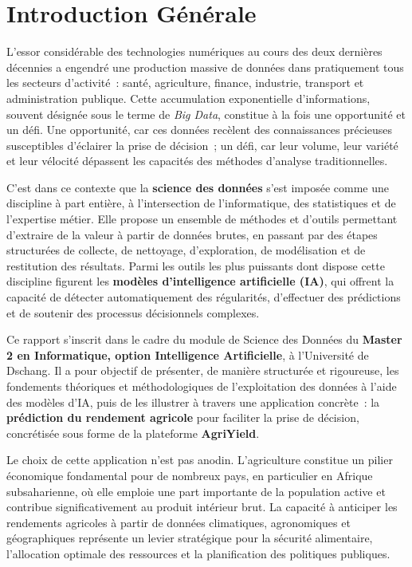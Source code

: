 \chapter*{Introduction Générale}

L'essor considérable des technologies numériques au cours des deux dernières décennies a engendré une production massive de données dans pratiquement tous les secteurs d'activité~: santé, agriculture, finance, industrie, transport et administration publique. Cette accumulation exponentielle d'informations, souvent désignée sous le terme de \textit{Big Data}, constitue à la fois une opportunité et un défi. Une opportunité, car ces données recèlent des connaissances précieuses susceptibles d'éclairer la prise de décision~; un défi, car leur volume, leur variété et leur vélocité dépassent les capacités des méthodes d'analyse traditionnelles.

C'est dans ce contexte que la \textbf{science des données} s'est imposée comme une discipline à part entière, à l'intersection de l'informatique, des statistiques et de l'expertise métier. Elle propose un ensemble de méthodes et d'outils permettant d'extraire de la valeur à partir de données brutes, en passant par des étapes structurées de collecte, de nettoyage, d'exploration, de modélisation et de restitution des résultats. Parmi les outils les plus puissants dont dispose cette discipline figurent les \textbf{modèles d'intelligence artificielle (IA)}, qui offrent la capacité de détecter automatiquement des régularités, d'effectuer des prédictions et de soutenir des processus décisionnels complexes.

Ce rapport s'inscrit dans le cadre du module de Science des Données du \textbf{Master 2 en Informatique, option Intelligence Artificielle}, à l'Université de Dschang. Il a pour objectif de présenter, de manière structurée et rigoureuse, les fondements théoriques et méthodologiques de l'exploitation des données à l'aide des modèles d'IA, puis de les illustrer à travers une application concrète~: la \textbf{prédiction du rendement agricole} pour faciliter la prise de décision, concrétisée sous forme de la plateforme \textbf{AgriYield}.

Le choix de cette application n'est pas anodin. L'agriculture constitue un pilier économique fondamental pour de nombreux pays, en particulier en Afrique subsaharienne, où elle emploie une part importante de la population active et contribue significativement au produit intérieur brut. La capacité à anticiper les rendements agricoles à partir de données climatiques, agronomiques et géographiques représente un levier stratégique pour la sécurité alimentaire, l'allocation optimale des ressources et la planification des politiques publiques.

